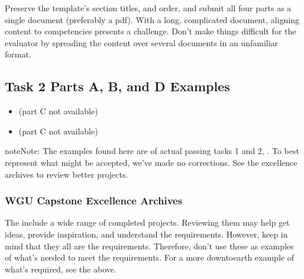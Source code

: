 \documentclass[letterpaper,10pt,english]{jupyterBook}
\begin{document}
\sphinxAtStartPar
Preserve the template’s section titles, and order, and submit all four parts as a single document (preferably a pdf). With a long, complicated document, aligning content to competencies presents a challenge. Don’t make things difficult for the evaluator by spreading the content over several documents in an unfamiliar format.


\subsection{Task 2 Parts A, B, and D Examples}
\label{\detokenize{resources:task-2-parts-a-b-and-d-examples}}\label{\detokenize{resources:resources-task2doc-docexample}}
\sphinxAtStartPar
{}
\begin{itemize}
\item {} 
\sphinxAtStartPar
{} (part C not available)

\end{itemize}

\sphinxAtStartPar
{}
\begin{itemize}
\item {} 
\sphinxAtStartPar
{} (part C not available)

\end{itemize}

\begin{sphinxadmonition}{note}{Note:}
\sphinxAtStartPar
The examples found here are of actual passing tasks 1 and 2, . To best represent what might be accepted, we’ve made no corrections. See the excellence archives to review better projects.
\end{sphinxadmonition}


\subsubsection{WGU Capstone Excellence Archives}
\label{\detokenize{resources:wgu-capstone-excellence-archives}}\label{\detokenize{resources:resources-examples-excellent-archives}}
\sphinxAtStartPar
The  include a wide range of completed projects. Reviewing them may help get ideas, provide inspiration, and understand the requirements. However, keep in mind that they all are  the requirements. Therefore, don’t use these as examples of what’s needed to meet the requirements. For a more down\sphinxhyphen{}to\sphinxhyphen{}earth example of what’s required, see the {\hyperref[\detokenize{resources:resources-examples}]{}} above.
\end{document}
